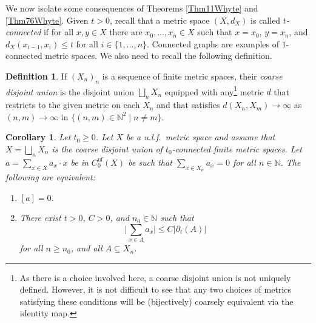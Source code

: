 \documentclass[11pt]{amsart}
\newcommand{\N}{\mathbb{N}}
\numberwithin{equation}{section}
\newtheorem{corollary}[theorem]{Corollary}
\theoremstyle{definition}
\newtheorem{definition}[theorem]{Definition}
\theoremstyle{remark}
\newcommand{\ri}{\partial}
\numberwithin{equation}{section}
\begin{document}
We now isolate some consequences of Theorems \ref{Thm11Whyte} and \ref{Thm76Whyte}. Given $t>0$, recall that a metric space $(X,d_X)$ is called \emph{$t$-connected} if for all $x,y\in X$ there are $x_0,\ldots, x_n\in X$ such that $x=x_0$, $y=x_n$, and $d_X(x_{i-1},x_i)\leq t$ for all $i\in \{1,\ldots, n\}$. Connected graphs are examples of $1$-connected metric spaces. We also need to recall the following definition. 
 
\begin{definition}\label{cdu def}
If $(X_n)_n$ is a sequence of finite metric spaces, their \emph{coarse disjoint union} is the disjoint union $\bigsqcup_n X_n$ equipped with any\footnote{As there is a choice involved here, a coarse disjoint union is not uniquely defined. However, it is not difficult to see that any two choices of metrics satisfying these conditions will be (bijectively) coarsely equivalent via the identity map.} metric $d$ that restricts to the given metric on each $X_n$  and that satisfies $d(X_n,X_m)\to \infty$ as $(n,m)\to\infty$ in $\{(n,m)\in \N^2\mid n\neq m\}$.
\end{definition}

\begin{corollary}
 Let $t_0\geq 0$. Let $X$ be a u.l.f.\ metric space and assume that $X=\bigsqcup_n X_n$ is the coarse disjoint union of $t_0$-connected finite metric spaces. Let $a=\sum_{x\in X}a_x\cdot x$ be in $C_0^{\textrm{uf}}(X)$ be such that $\sum_{x\in X_n}a_x=0$ for all $n\in\N$. The following are equivalent:
\begin{enumerate}
\item \label{a=0} $[a]=0$. 
\item \label{exists t} There exist $t>0$, $C>0$, and $n_0\in\N$ such that 
 \[
 \Bigg|\sum_{x\in A}a_x\Bigg|\leq C|\ri_t(A)| 
 \]
 for all $n\geq n_0$, and all $A\subseteq X_n$.
 \end{enumerate}
 \label{CorThm76Whyte}
\end{corollary}
\end{document}
